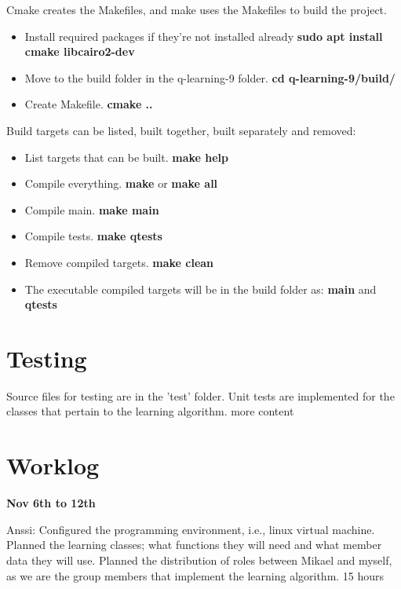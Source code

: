 \documentclass{article}
\begin{document}
Cmake creates the Makefiles, and make uses the Makefiles to build the project.

\begin{itemize}
  \item Install required packages if they're not installed already
  \textbf{sudo apt install cmake libcairo2-dev}

  \item Move to the build folder in the q-learning-9 folder.
  \textbf{cd q-learning-9/build/}

  \item Create Makefile.
  \textbf{cmake ..}
\end{itemize}

Build targets can be listed, built together, built separately and removed:

\begin{itemize}
  \item List targets that can be built. \textbf{make help}

 \item Compile everything. \textbf{make} or \textbf{make all}

 \item Compile main. \textbf{make main}

 \item Compile tests. \textbf{make qtests}

 \item Remove compiled targets. \textbf{make clean}

 \item The executable compiled targets will be in the build folder as:
  \textbf{main} and \textbf{qtests}
\end{itemize}

\section{Testing}

Source files for testing are in the 'test' folder. Unit tests
are implemented for
the classes that pertain to the learning algorithm. more content


\section{Worklog}

\textbf{Nov 6th to 12th}

Anssi:
Configured the programming environment, i.e., linux virtual machine.
Planned the learning classes; what functions they will need and what
member data they will use. Planned the distribution of roles between
Mikael and myself, as we are the group members that implement the learning
algorithm.
15 hours
\end{document}

